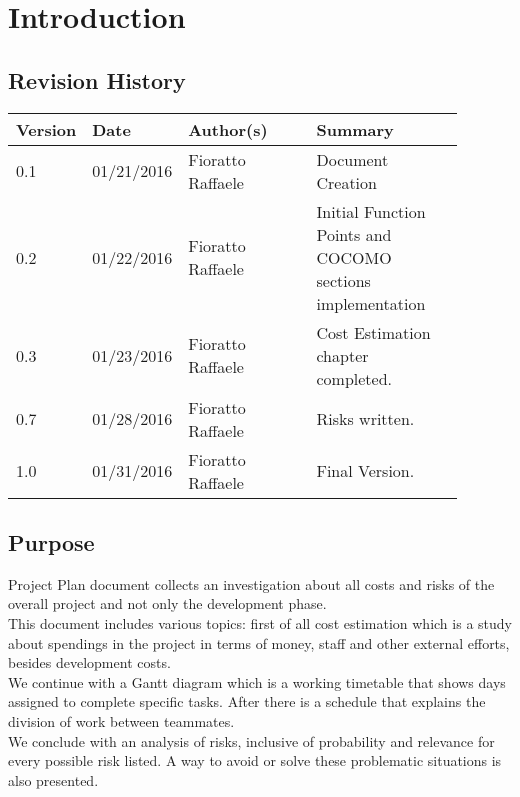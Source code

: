 \newpage
\section{Introduction}
\subsection{Revision History}
\begin{table}[H]
	\centering
	\begin{tabular*}{\linewidth}{|p{0.1\linewidth}|p{0.13\linewidth}|p{0.3099\linewidth}|p{0.3499\linewidth}|}
		\hline
		\textbf{Version} & \textbf{Date}       & \textbf{Author(s)}         & \textbf{Summary}           \\ \hline
		0.1     & 01/21/2016 & Fioratto Raffaele & Document Creation \\ \hline
		0.2     & 01/22/2016 & Fioratto Raffaele & Initial Function Points and COCOMO sections implementation \\ \hline
		0.3		& 01/23/2016 & Fioratto Raffaele &
		Cost Estimation chapter completed. \\ \hline
		0.7		& 01/28/2016 & Fioratto Raffaele & Risks written. \\ \hline
		1.0		& 01/31/2016 & Fioratto Raffaele & Final Version. \\ \hline
	\end{tabular*}
\end{table}
\break
\subsection{Purpose}
Project Plan document collects an investigation about all costs and risks of the overall project and not only the development phase.\\
This document includes various topics: first of all cost estimation which is a study about spendings in the project in terms of money, staff and other external efforts, besides development costs.\\
We continue with a Gantt diagram which is a working timetable that shows days assigned to complete specific tasks. After there is a schedule that explains the division of work between teammates.\\
We conclude with an analysis of risks, inclusive of probability and relevance for every possible risk listed. A way to avoid or solve these problematic situations is also presented. 
